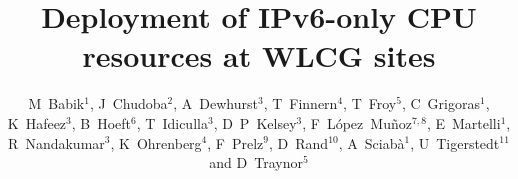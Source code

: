 \documentclass[a4paper]{jpconf}
\begin{document}
\title{Deployment of IPv6-only CPU resources at WLCG sites}


\author{M~Babik$^1$, J~Chudoba$^2$, A~Dewhurst$^3$, T~Finnern$^4$, T~Froy$^5$,
        C~Grigoras$^1$, K~Hafeez$^3$, B~Hoeft$^6$, T~Idiculla$^3$, D~P~Kelsey$^3$,  
        F~L\'opez~Mu\~noz$^{7,8}$, E~Martelli$^1$, R~Nandakumar$^3$, 
        K~Ohrenberg$^4$, F~Prelz$^{9}$, D~Rand$^{10}$, 
        A~Sciab\`a$^1$, U~Tigerstedt$^{11}$ and D~Traynor$^5$}

\address{$^1$ European Organization for Nuclear Research (CERN), CH-1211 Geneva 23, Switzerland}
\address{$^2$ Institute of Physics, Academy of Sciences of the Czech Republic Na Slovance 2 182 21 Prague 8, Czech Republic}
\address{$^3$ STFC Rutherford Appleton Laboratory, Harwell Campus, Didcot, Oxfordshire OX11 0QX, United Kingdom}
\address{$^4$ Deutsches Elektronen-Synchrotron DESY, Notkestra\ss e 85, D-22607 Hamburg, Germany}
\address{$^5$ Queen Mary University of London, Mile End Road, London E1 4NS, United Kingdom}
\address{$^6$ Karlsruher Institut f\"ur Technologie, Hermann-von-Helmholtz-Platz 1, D-76344 Eggenstein-Leopoldshafen, Germany}
\address{$^7$ Port d'Informaci\'o Cient\'ifica, Campus UAB, Edifici D, E-08193 Bellaterra, Spain}
\address{$^8$ Also Centro de Investigaciones Energ\'eticas, Medioambientales y Tecnol\'ogicas (CIEMAT), Madrid, Spain}
\address{$^9$ INFN, Sezione di Milano, via G. Celoria 16, I-20133 Milano, Italy}
\address{$^{10}$ Imperial College London, South Kensington Campus, London SW7 2AZ, United Kingdom}
\address{$^{11}$ CSC Tieteen Tietotekniikan Keskus Oy, P.O. Box 405, FI-02101 Espoo}
  
\end{document}

